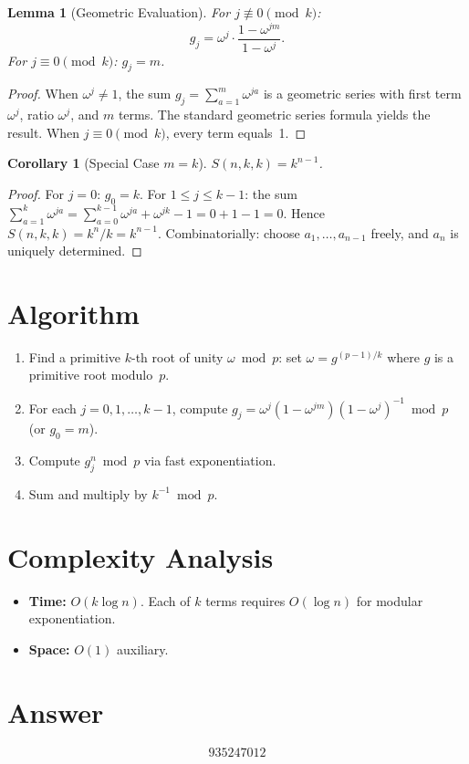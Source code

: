 \documentclass[11pt]{article}
\newtheorem{lemma}[theorem]{Lemma}
\newtheorem{corollary}[theorem]{Corollary}
\begin{document}
\begin{lemma}[Geometric Evaluation]
For $j \not\equiv 0 \pmod{k}$:
\[
g_j = \omega^j \cdot \frac{1 - \omega^{jm}}{1 - \omega^j}.
\]
For $j \equiv 0 \pmod{k}$: $g_j = m$.
\end{lemma}

\begin{proof}
When $\omega^j \neq 1$, the sum $g_j = \sum_{a=1}^{m}\omega^{ja}$ is a geometric series with first term $\omega^j$, ratio $\omega^j$, and $m$ terms. The standard geometric series formula yields the result. When $j \equiv 0 \pmod{k}$, every term equals~1.
\end{proof}

\begin{corollary}[Special Case $m = k$]
$S(n, k, k) = k^{n-1}$.
\end{corollary}

\begin{proof}
For $j = 0$: $g_0 = k$. For $1 \leq j \leq k-1$: the sum $\sum_{a=1}^{k}\omega^{ja} = \sum_{a=0}^{k-1}\omega^{ja} + \omega^{jk} - 1 = 0 + 1 - 1 = 0$. Hence $S(n,k,k) = k^n/k = k^{n-1}$. Combinatorially: choose $a_1, \ldots, a_{n-1}$ freely, and $a_n$ is uniquely determined.
\end{proof}

\section{Algorithm}

\begin{enumerate}
    \item Find a primitive $k$-th root of unity $\omega \bmod p$: set $\omega = g^{(p-1)/k}$ where $g$ is a primitive root modulo~$p$.
    \item For each $j = 0, 1, \ldots, k-1$, compute $g_j = \omega^j(1 - \omega^{jm})(1 - \omega^j)^{-1} \bmod p$ (or $g_0 = m$).
    \item Compute $g_j^n \bmod p$ via fast exponentiation.
    \item Sum and multiply by $k^{-1} \bmod p$.
\end{enumerate}

\section{Complexity Analysis}

\begin{itemize}
    \item \textbf{Time:} $O(k \log n)$. Each of $k$ terms requires $O(\log n)$ for modular exponentiation.
    \item \textbf{Space:} $O(1)$ auxiliary.
\end{itemize}

\section{Answer}

\[
\boxed{935247012}
\]
\end{document}
